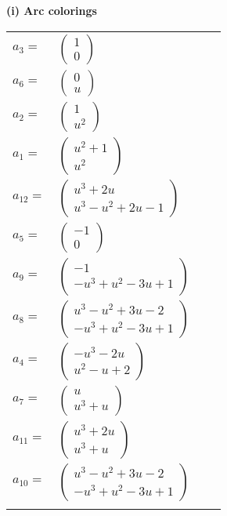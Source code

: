 \documentclass[1p]{elsarticle_modified}
\theoremstyle{definition}
\begin{document}
\flushleft \textbf{(i) Arc colorings}\\
\begin{tabular}{m{7pt} m{180pt} m{7pt} m{180pt} }
\flushright $a_{3}=$&$\begin{pmatrix}1\\0\end{pmatrix}$ \\
\flushright $a_{6}=$&$\begin{pmatrix}0\\u\end{pmatrix}$ \\
\flushright $a_{2}=$&$\begin{pmatrix}1\\u^2\end{pmatrix}$ \\
\flushright $a_{1}=$&$\begin{pmatrix}u^2+1\\u^2\end{pmatrix}$ \\
\flushright $a_{12}=$&$\begin{pmatrix}u^3+2 u\\u^3- u^2+2 u-1\end{pmatrix}$ \\
\flushright $a_{5}=$&$\begin{pmatrix}-1\\0\end{pmatrix}$ \\
\flushright $a_{9}=$&$\begin{pmatrix}-1\\- u^3+u^2-3 u+1\end{pmatrix}$ \\
\flushright $a_{8}=$&$\begin{pmatrix}u^3- u^2+3 u-2\\- u^3+u^2-3 u+1\end{pmatrix}$ \\
\flushright $a_{4}=$&$\begin{pmatrix}- u^3-2 u\\u^2- u+2\end{pmatrix}$ \\
\flushright $a_{7}=$&$\begin{pmatrix}u\\u^3+u\end{pmatrix}$ \\
\flushright $a_{11}=$&$\begin{pmatrix}u^3+2 u\\u^3+u\end{pmatrix}$ \\
\flushright $a_{10}=$&$\begin{pmatrix}u^3- u^2+3 u-2\\- u^3+u^2-3 u+1\end{pmatrix}$\\&\end{tabular}
\end{document}
